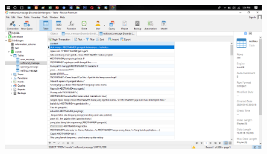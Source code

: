 \documentclass{book}
\begin{document}
\begin{enumerate}
\begin{figure}
    \centerline{\includegraphics [width=11.62cm, height=6.53cm]{figures/2.5.png}}\\
\end{figure}
\end{enumerate}
\end{document}

